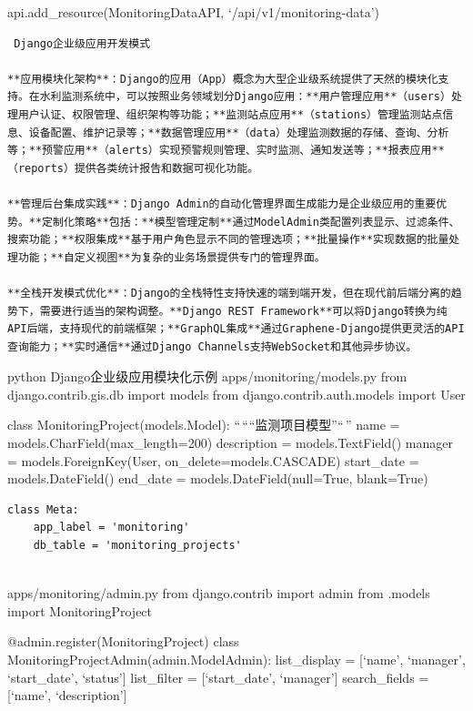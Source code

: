 api.add\_resource(MonitoringDataAPI, `/api/v1/monitoring-data')

\begin{lstlisting}
 Django企业级应用开发模式

**应用模块化架构**：Django的应用（App）概念为大型企业级系统提供了天然的模块化支持。在水利监测系统中，可以按照业务领域划分Django应用：**用户管理应用**（users）处理用户认证、权限管理、组织架构等功能；**监测站点应用**（stations）管理监测站点信息、设备配置、维护记录等；**数据管理应用**（data）处理监测数据的存储、查询、分析等；**预警应用**（alerts）实现预警规则管理、实时监测、通知发送等；**报表应用**（reports）提供各类统计报告和数据可视化功能。

**管理后台集成实践**：Django Admin的自动化管理界面生成能力是企业级应用的重要优势。**定制化策略**包括：**模型管理定制**通过ModelAdmin类配置列表显示、过滤条件、搜索功能；**权限集成**基于用户角色显示不同的管理选项；**批量操作**实现数据的批量处理功能；**自定义视图**为复杂的业务场景提供专门的管理界面。

**全栈开发模式优化**：Django的全栈特性支持快速的端到端开发，但在现代前后端分离的趋势下，需要进行适当的架构调整。**Django REST Framework**可以将Django转换为纯API后端，支持现代的前端框架；**GraphQL集成**通过Graphene-Django提供更灵活的API查询能力；**实时通信**通过Django Channels支持WebSocket和其他异步协议。
\end{lstlisting}

python  Django企业级应用模块化示例  apps/monitoring/models.py from django.contrib.gis.db import models from django.contrib.auth.models import User

class MonitoringProject(models.Model): ``\,````监测项目模型''``\,'' name = models.CharField(max\_length=200) description = models.TextField() manager = models.ForeignKey(User, on\_delete=models.CASCADE) start\_date = models.DateField() end\_date = models.DateField(null=True, blank=True)

\begin{verbatim}
class Meta:
    app_label = 'monitoring'
    db_table = 'monitoring_projects'
    
\end{verbatim}

 apps/monitoring/admin.py from django.contrib import admin from .models import MonitoringProject

@admin.register(MonitoringProject) class MonitoringProjectAdmin(admin.ModelAdmin): list\_display = {[}`name', `manager', `start\_date', `status'{]} list\_filter = {[}`start\_date', `manager'{]} search\_fields = {[}`name', `description'{]}

